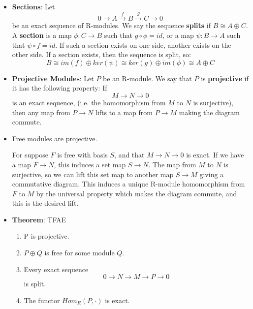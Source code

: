 \documentclass[11pt, oneside]{amsart}   	%
\theoremstyle{definition}
\begin{document}
\begin{itemize}
	\item \textbf{Sections}: Let 
	$$
		0\rightarrow A\xrightarrow{f} B\xrightarrow{g} C\rightarrow 0
	$$
	be an exact sequence of R-modules. We say the sequence \textbf{splits} if $B\cong A\oplus C$. A \textbf{section} is a map $\phi : C\rightarrow B$ 
	such that $g\circ\phi = id$, or a map $\psi : B\rightarrow A$ such that $\psi\circ f = id$. If such a section exists on one side, another exists on the 
	other side. If a section exists, then the sequence is split, so:
	$$
		B\cong im(f)\oplus ker(\psi) \cong ker(g)\oplus im(\phi)\cong A\oplus C
	$$
	
	\item \textbf{Projective Modules}: Let $P$ be an R-module. We say that $P$ is \textbf{projective} if it has the following property: If 
	$$
		M\rightarrow N\rightarrow 0
	$$
	is an exact sequence, (i.e. the homomorphism from $M$ to $N$ is surjective), then any map from $P\rightarrow N$ lifts to a map from $P
	\rightarrow M$ making the diagram commute.
	
	\item Free modules are projective.
	
	For suppose $F$ is free with basis $S$, and that $M\rightarrow N\rightarrow 0$ is exact. If we have a map $F\rightarrow N$, this induces a set 
	map $S\rightarrow N$. The map from $M$ to $N$ is surjective, so we can lift this set map to another map $S\rightarrow M$ giving a commutative 
	diagram. This induces a unique R-module homomorphism from $F$ to $M$ by the universal property which makes the diagram commute, and this 
	is the desired lift.
	
	\item \textbf{Theorem}: TFAE
	
		\begin{enumerate}
		
			\item P is projective.
			
			\item $P\oplus Q$ is free for some module $Q$.
			
			\item Every exact sequence 
			$$
				0\rightarrow N\rightarrow M\rightarrow P\rightarrow 0
			$$
			is split.
			
			\item The functor $Hom_R(P, \cdot)$ is exact.
		
		\end{enumerate}
	

\end{itemize}
\end{document}
